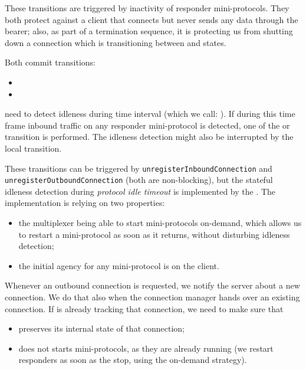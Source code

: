 These transitions are triggered by inactivity of responder mini-protocols. They
both protect against a client that connects but never sends any data through
the bearer; also, as part of a termination sequence, it is protecting us from
shutting down a connection which is transitioning between \warm{} and \hot{}
states.

Both commit transitions:
\begin{itemize}
  \item \CommitDupRem{}
  \item \CommitUniRem{}
\end{itemize}

need to detect idleness during time interval (which we call: ). If during this time frame inbound traffic on any responder
mini-protocol is detected, one of the \AwakeDupRem{} or \AwakeUniRem{}
transition is performed. The idleness detection might also be interrupted by
the local \AwakeDupLoc{} transition.

\begin{detail}
  These transitions can be triggered by \texttt{unregisterInboundConnection} and
  \texttt{unregisterOutboundConnection} (both are non-blocking), but the
  stateful idleness detection during \textit{protocol idle timeout} is
  implemented by the \inbgov{}.  The implementation is relying on two
  properties:
  \begin{itemize}
    \item the multiplexer being able to start mini-protocols on-demand, which
      allows us to restart a mini-protocol as soon as it returns, without
      disturbing idleness detection;
    \item the initial agency for any mini-protocol is on the client.
  \end{itemize}
\end{detail}

\begin{detail}
  Whenever an outbound connection is requested, we notify the server about
  a new connection.  We do that also when the connection manager hands over an
  existing connection.  If \inbgov{} is already tracking that connection,
  we need to make sure that
  \begin{itemize}
    \item \inbgov{} preserves its internal state of that connection;
    \item \inbgov{} does not starts mini-protocols, as they are already running
      (we restart responders as soon as the stop, using the on-demand
      strategy).
  \end{itemize}
\end{detail}


